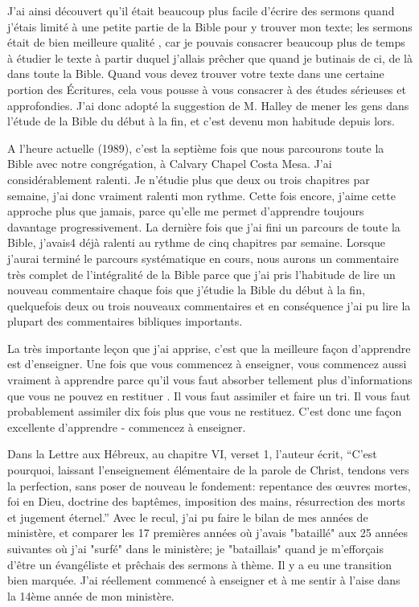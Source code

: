 J'ai ainsi découvert qu’il était beaucoup plus facile d’écrire des sermons quand j’étais limité à une petite partie de la
Bible pour y trouver mon texte; les sermons était de bien meilleure qualité , car je pouvais consacrer beaucoup plus de
temps à étudier le texte à partir duquel j’allais prêcher que quand je butinais de ci, de là dans toute la Bible. Quand
vous devez trouver votre texte dans une certaine portion des Écritures, cela vous pousse à vous consacrer à des
études sérieuses et approfondies. J’ai donc adopté la suggestion de M. Halley de mener les gens dans l'étude de la
Bible du début à la fin, et c’est devenu mon habitude depuis lors.

A l’heure actuelle (1989), c'est la septième fois que nous parcourons toute la Bible avec notre congrégation, à Calvary
Chapel Costa Mesa. J’ai considérablement ralenti. Je n’étudie plus que deux ou trois chapitres par semaine, j’ai donc
vraiment ralenti mon rythme. Cette fois encore, j’aime cette approche plus que jamais, parce qu'elle me permet
d'apprendre toujours davantage progressivement. La dernière fois que j’ai fini un parcours de toute la Bible, j'avais4
déjà ralenti au rythme de cinq chapitres par semaine. Lorsque j’aurai terminé le parcours systématique en cours,
nous aurons un commentaire très complet de l’intégralité de la Bible parce que j’ai pris l’habitude de lire un nouveau
commentaire chaque fois que j’étudie la Bible du début à la fin, quelquefois deux ou trois nouveaux commentaires et
en conséquence j’ai pu lire la plupart des commentaires bibliques importants.

La très importante leçon que j’ai apprise, c’est que la meilleure façon d’apprendre est d’enseigner. Une fois que vous
commencez à enseigner, vous commencez aussi vraiment à apprendre parce qu’il vous faut absorber tellement plus
d’informations que vous ne pouvez en restituer . Il vous faut assimiler et faire un tri. Il vous faut probablement
assimiler dix fois plus que vous ne restituez. C’est donc une façon excellente d’apprendre - commencez à enseigner.

Dans la Lettre aux Hébreux, au chapitre VI, verset 1, l’auteur écrit, “C’est pourquoi, laissant l’enseignement
élémentaire de la parole de Christ, tendons vers la perfection, sans poser de nouveau le fondement: repentance des
œuvres mortes, foi en Dieu, doctrine des baptêmes, imposition des mains, résurrection des morts et jugement
éternel.” Avec le recul, j'ai pu faire le bilan de mes années de ministère, et comparer les 17 premières années où
j'avais "bataillé" aux 25 années suivantes où j'ai "surfé" dans le ministère; je "bataillais" quand je m'efforçais d’être un
évangéliste et prêchais des sermons à thème. Il y a eu une transition bien marquée. J’ai réellement commencé à
enseigner et à me sentir à l’aise dans la 14ème année de mon ministère.

